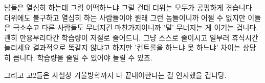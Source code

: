 남들은 열심히 하는데 그럼 어떡하느냐 그럴 건데 더위는 모두가 공평하게 겪습니다.
더위에도 불구하고 열심히 하는 사람들이야 원래 그런 놈들이니까 어쩔 수 없지만 이들은 극소수고
다른 사람들도 무너지긴 마찬가지이니까 '덜' 무너지는 게 이기는 겁니다.
괜히 만용부리다간 학습량이 저절로 줄어드니, 그냥 스스로 줄이시고 일부러 휴식시간 늘리세요
결과적으로 똑같지 않냐고 하지만 '컨트롤을 하느냐 못 하느냐' 차이는 상당히 큽니다.
학습량을 줄일 수 있어야 늘릴 수 있죠.
\vspace{5mm}

그리고 고2들은 사실상 겨울방학까지 다 끝내야한다는 걸 인지했을 겁니당.
\vspace{5mm}
